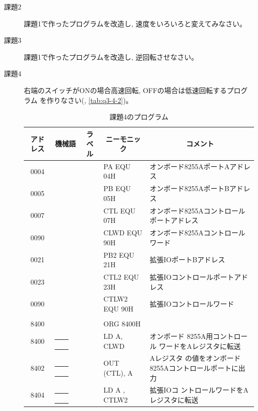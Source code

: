 \begin{description}
\begin{table}
\begin{center}
\begin{tabular}{|c|l|ll|l|}
\hline
\end{tabular}
\end{center}
\end{table}


\item[課題2] 課題1で作ったプログラムを改造し, 速度をいろいろと変えてみなさい。

\item[課題3] 課題1で作ったプログラムを改造し, 逆回転させなさい。

\item[課題4] 右端のスイッチがONの場合高速回転, OFFの場合は低速回転するプログラム
           を作りなさい(, \ref{tab:q3-4-2})。

\begin{table}
\begin{center}
\caption{課題4のプログラム}
\label{tab:q3-4-1}
\footnotesize
\begin{tabular}{|c|l|ll|l|}
\hline
アドレス& \multicolumn{1}{|c|}{機械語}&\multicolumn{1}{|c}{ラベル}&\multicolumn{1}{c|}{ニーモニック}&\multicolumn{1}{|c|}{コメント}\\
\hline
   0004 &          &  & PA EQU 04H& オンボード8255AポートAアドレス\\
   0005 &          &  & PB EQU 05H& オンボード8255AポートBアドレス\\
   0007 &          &  & CTL EQU 07H& オンボード8255Aコントロールポートアドレス\\
   0090 &          &  & CLWD EQU 90H& オンボード8255Aコントロールワード\\
   0021 &          &  & PB2 EQU 21H& 拡張IOポートBアドレス\\
   0023 &          &  & CTL2 EQU 23H& 拡張IOコントロールポートアドレス\\
   0090 &          &  & CTLW2 EQU 90H& 拡張IOコントロールワード\\
     &          &  & &\\
   8400 &          &  &     ORG 8400H&\\
   8400 & \underline{~~~~} \underline{~~~~}    &  &    LD A, CLWD& オンボード
                    8255A用コントロール
                    ワードをAレジスタに転送\\
   8402 & \underline{~~~~} \underline{~~~~}    &  &     OUT (CTL), A& Aレジスタ
                    の値をオンボード8255Aコントロールポートに出力\\
   8404 & \underline{~~~~} \underline{~~~~}     &  &     LD A , CTLW2& 拡張IOコ
                    ントロールワードをAレジスタに転送\\

\end{tabular}
\end{center}
\end{table}
\end{description}

